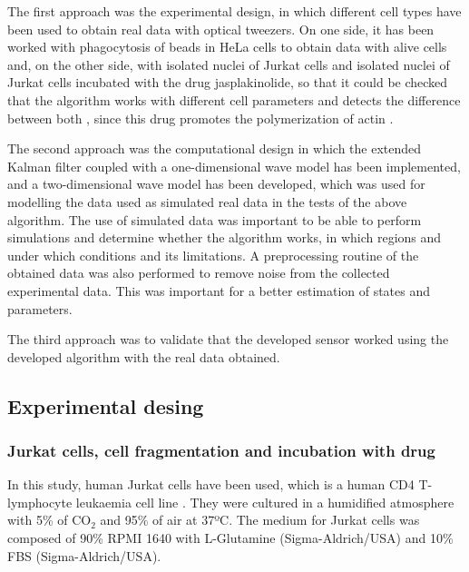 \documentclass[12pt, a4paper]{article} %
\begin{document}
The first approach was the experimental design, in which different cell types have been used to obtain real data with optical tweezers. On one side, it has been worked with phagocytosis of beads in HeLa cells \cite{gey1952tissue} to obtain data with alive cells and, on the other side, with isolated nuclei of Jurkat cells \cite{schneider1977characterization, gioia2018genome} and isolated nuclei of Jurkat cells incubated with the drug jasplakinolide, so that it could be checked that the algorithm works with different cell parameters and detects the difference between both \cite{andersen2002directed}, since this drug promotes the polymerization of actin \cite{holzinger2001jasplakinolide}.

The second approach was the computational design in which the extended Kalman filter coupled with a one-dimensional wave model has been implemented, and a two-dimensional wave model has been developed, which was used for modelling the data used as simulated real data in the tests of the above algorithm.  The use of simulated data was important to be able to perform simulations and determine whether the algorithm works, in which regions and under which conditions and its limitations. A preprocessing routine of the obtained data was also performed to remove noise from the collected experimental data. This was important for a better estimation of states and parameters.

The third approach was to validate that the developed sensor worked using the developed algorithm with the real data obtained. 

\setlength{\parskip}{0mm}

\subsection{Experimental desing}

\subsubsection{Jurkat cells, cell fragmentation and incubation with drug}

In this study, human Jurkat cells have been used,  which is a human CD4 T-lymphocyte leukaemia cell line \cite{schneider1977characterization}. They were cultured in a humidified atmosphere with 5\% of CO$_{2}$ and 95\% of air at 37ºC. The medium for Jurkat cells was composed of 90\% RPMI 1640 with L-Glutamine (Sigma-Aldrich/USA) and 10\% FBS (Sigma-Aldrich/USA).
\end{document}
